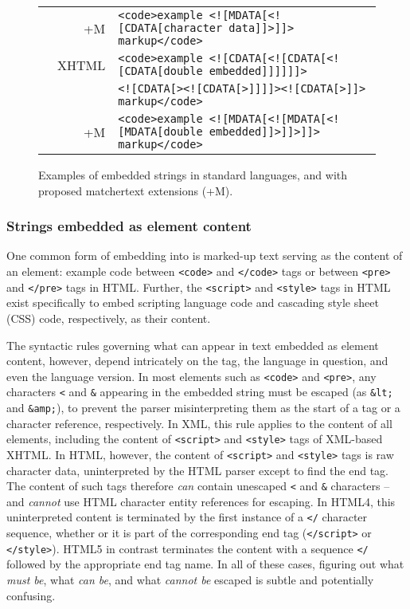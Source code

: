 \begin{figure*}
\begin{center}
\begin{footnotesize}
\begin{tabular}{lrl}
& +M	& \verb|<code>example <![MDATA[<![CDATA[character data]]>]]> markup</code>| \\
& XHTML	& \verb|<code>example <![CDATA[<![CDATA[<![CDATA[double embedded]]]]]]>| \\
&	& \verb|<![CDATA[><![CDATA[>]]]]><![CDATA[>]]> markup</code>| \\
& +M	& \verb|<code>example <![MDATA[<![MDATA[<![MDATA[double embedded]]>]]>]]> markup</code>| \\
\end{tabular}
\end{footnotesize}
\end{center}
\caption{Examples of embedded strings in standard \ml languages,
	and with proposed matchertext extensions (+M).}
\label{fig:ml-emb}
\end{figure*}


\subsubsection{Strings embedded as element content}
\label{sec:host:ml:element}

One common form of embedding into \ml 
is marked-up text serving as the content of an element:
\eg example code between \verb|<code>| and \verb|</code>| tags
or between \verb|<pre>| and \verb|</pre>| tags in HTML.
Further, the \verb|<script>| and \verb|<style>| tags in HTML
exist specifically to embed scripting language code
and cascading style sheet (CSS) code, respectively,
as their content.

The syntactic rules governing
what can appear in text embedded as element content,
however,
depend intricately on the tag, the \ml language in question,
and even the language version.
In most elements such as \verb|<code>| and \verb|<pre>|,
any characters \verb|<| and \verb|&| appearing in the embedded string
must be escaped (as \verb|&lt;| and \verb|&amp;|),
to prevent the \ml parser misinterpreting them as
the start of a tag or a character reference,
respectively.
In XML, this rule applies to the content of all elements,
including the content of \verb|<script>| and \verb|<style>| tags
of XML-based XHTML.
In HTML, however, the content of \verb|<script>| and \verb|<style>| tags
is raw character data,
uninterpreted by the HTML parser except to find the end tag.
The content of such tags therefore \emph{can} contain
unescaped \verb|<| and \verb|&| characters --
and \emph{cannot} use HTML character entity references for escaping.
In HTML4, this uninterpreted content is terminated
by the first instance of a \verb|</| character sequence,
whether or it is part of the corresponding end tag
(\verb|</script>| or \verb|</style>|).
HTML5 in contrast terminates the content with a sequence \verb|</|
followed by the appropriate end tag name.
In all of these cases, figuring out what \emph{must be},
what \emph{can be}, and what \emph{cannot be}
escaped is subtle and potentially confusing.

